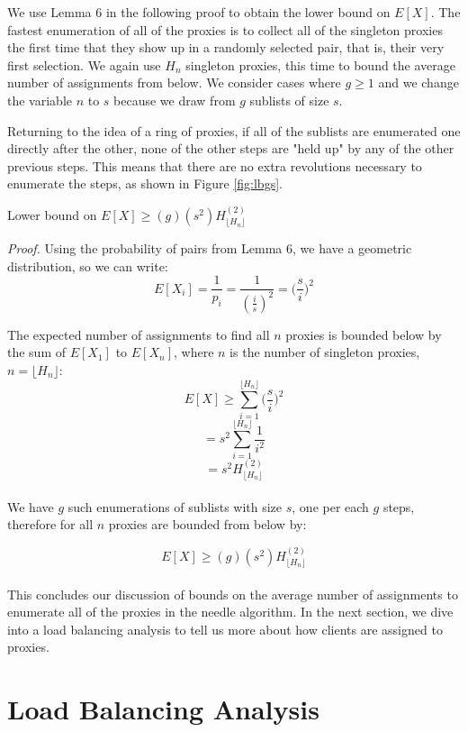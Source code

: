We use Lemma $6$ in the following proof to obtain the lower bound on $E[X]$. The fastest enumeration of all of the proxies is to collect all of the singleton proxies the first time that they show up in a randomly selected pair, that is, their very first selection. We again use $H_n$ singleton proxies, this time to bound the average number of assignments from below. We consider cases where $g\geq1$ and we change the variable $n$ to $s$ because we draw from $g$ sublists of size $s$. 

Returning to the idea of a ring of proxies, if all of the sublists are enumerated one directly after the other, none of the other steps are "held up" by any of the other previous steps. This means that there are no extra revolutions necessary to enumerate the steps, as shown in Figure \ref{fig:lbgs}.


\label{theorem:LBEX}
\begin{theorem} {Lower bound on $E[X] \geq (g) (s^2)H^{(2)}_{\lfloor{H_n}\rfloor}$}
\end{theorem}

\emph{Proof.} Using the probability of pairs from Lemma $6$, we have a geometric distribution, so we can write: $$E[X_i] = \frac{1}{p_i} = \frac{1}{(\frac{i}{s})^2} = \bigg(\frac{s}{i}\bigg)^2$$

The expected number of assignments to find all $n$ proxies is bounded below by the sum of $E[X_1]$ to $E[X_n]$, where $n$ is the number of singleton proxies,$n=\lfloor{H_n}\rfloor$:\\

$$E[X] \geq \sum_{i=1}^{\lfloor{H_n}\rfloor} \bigg(\frac{s}{i}\bigg)^2$$
$$= s^2 \sum_{i=1}^{\lfloor{H_n}\rfloor} \frac{1}{i^2}$$
$$= s^2H^{(2)}_{\lfloor{H_n}\rfloor}$$\\

We have $g$ such enumerations of sublists with size $s$, one per each $g$ steps, therefore for all $n$ proxies are bounded from below by:

$$E[X] \geq (g)(s^2)H^{(2)}_{\lfloor{H_n}\rfloor}$$\\

This concludes our discussion of bounds on the average number of assignments to enumerate all of the proxies in the needle algorithm. In the next section, we dive into a load balancing analysis to tell us more about how clients are assigned to proxies.

\label{sec:lb}
\section{Load Balancing Analysis}

